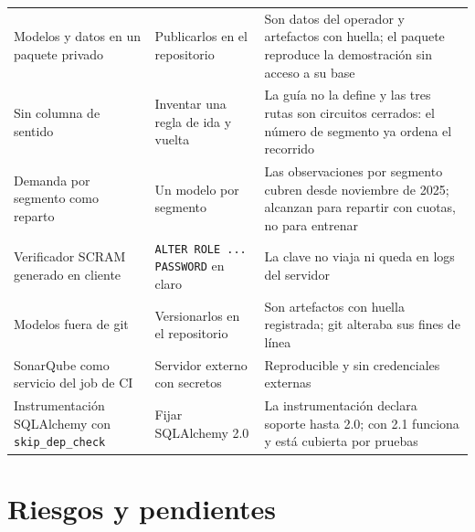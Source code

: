 \documentclass[10pt,a4paper]{article}
\newcommand{\cod}[1]{\texttt{\small #1}}
\begin{document}
\begin{longtable}{@{}p{}p{}p{}@{}}
Modelos y datos en un paquete privado & Publicarlos en el repositorio & Son datos del operador y artefactos con huella; el paquete reproduce la demostración sin acceso a su base \\
Sin columna de sentido & Inventar una regla de ida y vuelta & La guía no la define y las tres rutas son circuitos cerrados: el número de segmento ya ordena el recorrido \\
Demanda por segmento como reparto & Un modelo por segmento & Las observaciones por segmento cubren desde noviembre de 2025; alcanzan para repartir con cuotas, no para entrenar \\
Verificador SCRAM generado en cliente & \cod{ALTER ROLE ... PASSWORD} en claro & La clave no viaja ni queda en logs del servidor \\
Modelos fuera de git & Versionarlos en el repositorio & Son artefactos con huella registrada; git alteraba sus fines de línea \\
SonarQube como servicio del job de CI & Servidor externo con secretos & Reproducible y sin credenciales externas \\
Instrumentación SQLAlchemy con \cod{skip\_dep\_check} & Fijar SQLAlchemy 2.0 & La instrumentación declara soporte hasta 2.0; con 2.1 funciona y está cubierta por pruebas \\
\bottomrule
\end{longtable}

\section{Riesgos y pendientes}
\end{document}
